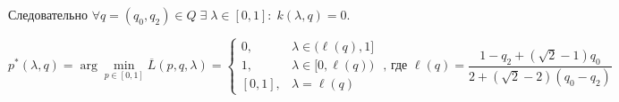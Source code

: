 \begin{flushleft}
	Следовательно $\forall q=(q_0, q_2) \in Q \;
	\exists \; \lambda \in [0,1]: \; k(\lambda,q)=0$.
	
	$$
		p^*(\lambda,q)=
		\arg \min \limits_{p \in [0, 1]} \overline{L}(p,q,\lambda)=
		\begin{cases}
			0, & \lambda \in \big(\ell (q), 1\big] \\
			1, & \lambda \in \big[0, \ell(q) \big) \\
			[0,1], & \lambda=\ell(q)
		\end{cases}
		\textrm{ , где } \ell(q)=
		\frac{1 - q_2 + (\sqrt{2} - 1)q_0}{2+(\sqrt{2}-2)(q_0-q_2)}
	$$	
	
\end{flushleft}